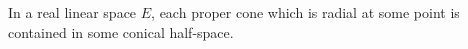 In a real linear space $E$, each proper cone which is radial at some point is contained in some conical half-space.
